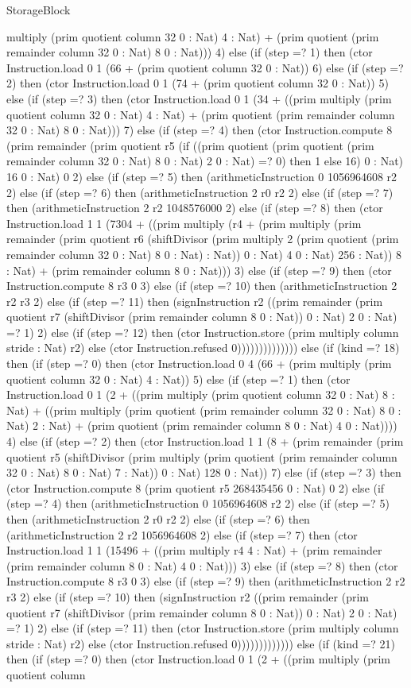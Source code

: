 \begin{lexlean}{StorageBlock}
\begin{semanticmodule}
{multiply (prim quotient column 32 0 : Nat) 4 : Nat) + (prim quotient (prim remainder column 32 0 : Nat) 8 0 : Nat))) 4) else (if (step =? 1) then (ctor Instruction.load 0 1 (66 + (prim quotient column 32 0 : Nat)) 6) else (if (step =? 2) then (ctor Instruction.load 0 1 (74 + (prim quotient column 32 0 : Nat)) 5) else (if (step =? 3) then (ctor Instruction.load 0 1 (34 + ((prim multiply (prim quotient column 32 0 : Nat) 4 : Nat) + (prim quotient (prim remainder column 32 0 : Nat) 8 0 : Nat))) 7) else (if (step =? 4) then (ctor Instruction.compute 8 (prim remainder (prim quotient r5 (if ((prim quotient (prim quotient (prim remainder column 32 0 : Nat) 8 0 : Nat) 2 0 : Nat) =? 0) then 1 else 16) 0 : Nat) 16 0 : Nat) 0 2) else (if (step =? 5) then (arithmeticInstruction 0 1056964608 r2 2) else (if (step =? 6) then (arithmeticInstruction 2 r0 r2 2) else (if (step =? 7) then (arithmeticInstruction 2 r2 1048576000 2) else (if (step =? 8) then (ctor Instruction.load 1 1 (7304 + ((prim multiply (r4 + (prim multiply (prim remainder (prim quotient r6 (shiftDivisor (prim multiply 2 (prim quotient (prim remainder column 32 0 : Nat) 8 0 : Nat) : Nat)) 0 : Nat) 4 0 : Nat) 256 : Nat)) 8 : Nat) + (prim remainder column 8 0 : Nat))) 3) else (if (step =? 9) then (ctor Instruction.compute 8 r3 0 3) else (if (step =? 10) then (arithmeticInstruction 2 r2 r3 2) else (if (step =? 11) then (signInstruction r2 ((prim remainder (prim quotient r7 (shiftDivisor (prim remainder column 8 0 : Nat)) 0 : Nat) 2 0 : Nat) =? 1) 2) else (if (step =? 12) then (ctor Instruction.store (prim multiply column stride : Nat) r2) else (ctor Instruction.refused 0)))))))))))))) else (if (kind =? 18) then (if (step =? 0) then (ctor Instruction.load 0 4 (66 + (prim multiply (prim quotient column 32 0 : Nat) 4 : Nat)) 5) else (if (step =? 1) then (ctor Instruction.load 0 1 (2 + ((prim multiply (prim quotient column 32 0 : Nat) 8 : Nat) + ((prim multiply (prim quotient (prim remainder column 32 0 : Nat) 8 0 : Nat) 2 : Nat) + (prim quotient (prim remainder column 8 0 : Nat) 4 0 : Nat)))) 4) else (if (step =? 2) then (ctor Instruction.load 1 1 (8 + (prim remainder (prim quotient r5 (shiftDivisor (prim multiply (prim quotient (prim remainder column 32 0 : Nat) 8 0 : Nat) 7 : Nat)) 0 : Nat) 128 0 : Nat)) 7) else (if (step =? 3) then (ctor Instruction.compute 8 (prim quotient r5 268435456 0 : Nat) 0 2) else (if (step =? 4) then (arithmeticInstruction 0 1056964608 r2 2) else (if (step =? 5) then (arithmeticInstruction 2 r0 r2 2) else (if (step =? 6) then (arithmeticInstruction 2 r2 1056964608 2) else (if (step =? 7) then (ctor Instruction.load 1 1 (15496 + ((prim multiply r4 4 : Nat) + (prim remainder (prim remainder column 8 0 : Nat) 4 0 : Nat))) 3) else (if (step =? 8) then (ctor Instruction.compute 8 r3 0 3) else (if (step =? 9) then (arithmeticInstruction 2 r2 r3 2) else (if (step =? 10) then (signInstruction r2 ((prim remainder (prim quotient r7 (shiftDivisor (prim remainder column 8 0 : Nat)) 0 : Nat) 2 0 : Nat) =? 1) 2) else (if (step =? 11) then (ctor Instruction.store (prim multiply column stride : Nat) r2) else (ctor Instruction.refused 0))))))))))))) else (if (kind =? 21) then (if (step =? 0) then (ctor Instruction.load 0 1 (2 + ((prim multiply (prim quotient column }
\end{semanticmodule}
\end{lexlean}
